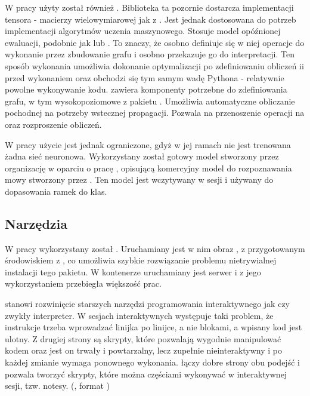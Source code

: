 W pracy użyty został również . Biblioteka ta pozornie dostarcza
implementacji tensora - macierzy wielowymiarowej jak z . Jest jednak
dostosowana do potrzeb implementacji algorytmów uczenia maszynowego. Stosuje model opóźnionej
ewaluacji, podobnie jak  lub . To znaczy, że
osobno definiuje się w niej operacje do wykonanie przez zbudowanie grafu i osobno przekazuje go do interpretacji.
Ten sposób wykonania umożliwia dokonanie optymalizacji po zdefiniowaniu obliczeń ii przed wykonaniem oraz
obchodzi się tym samym wadę Pythona - relatywnie powolne wykonywanie kodu.
 zawiera komponenty potrzebne do zdefiniowania grafu, w tym wysokopoziomowe
z pakietu . Umożliwia automatyczne obliczanie pochodnej na potrzeby wstecznej propagacji.
Pozwala na przenoszenie operacji na  oraz rozproszenie obliczeń.

W pracy użycie  jest jednak ograniczone, gdyż w jej ramach nie jest trenowana żadna
sieć neuronowa. Wykorzystany został gotowy model stworzony przez organizację  w oparciu o
pracę \cite{deepSpeechScaling}, opisującą komercyjny model do rozpoznawania mowy stworzony
przez . Ten model jest wczytywany w sesji  i używany do dopasowania
ramek do klas.

\subsection{Narzędzia}

W pracy wykorzystany został . Uruchamiany jest w nim obraz ,
z przygotowanym środowiskiem z , co umożliwia szybkie rozwiązanie problemu nietrywialnej instalacji
tego pakietu. W kontenerze uruchamiany jest serwer  i z jego wykorzystaniem przebiegła większość prac.

 stanowi rozwinięcie starszych narzędzi programowania interaktywnego jak  czy zwykły  interpreter. W sesjach interaktywnych występuje taki problem, że instrukcje trzeba wprowadzać linijka po linijce, a nie blokami, a wpisany kod jest ulotny. Z drugiej strony są skrypty, które pozwalają wygodnie manipulować kodem oraz jest on trwały i powtarzalny, lecz zupełnie nieinteraktywny i po każdej zmianie wymaga ponownego wykonania.  łączy dobre strony obu podejść i pozwala tworzyć skrypty, które można częściami wykonywać w interaktywnej sesji, tzw. notesy. (, format )


